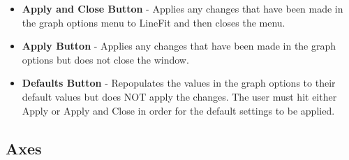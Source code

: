 \documentclass[titlepage,12pt]{article}
\begin{document}
\begin{itemize}
\item \textbf{Apply and Close Button} - Applies any changes that have been made in the graph options menu to LineFit and then closes the menu.
\item \textbf{Apply Button} - Applies any changes that have been made in the graph options but does not close the window.
\item \textbf{Defaults Button} - Repopulates the values in the graph options to their default values but does NOT apply the changes. The user must hit either Apply or Apply and Close in order for the default settings to be applied.
\end{itemize}



\subsection{Axes}
\label{subsec:axes}
\end{document}
